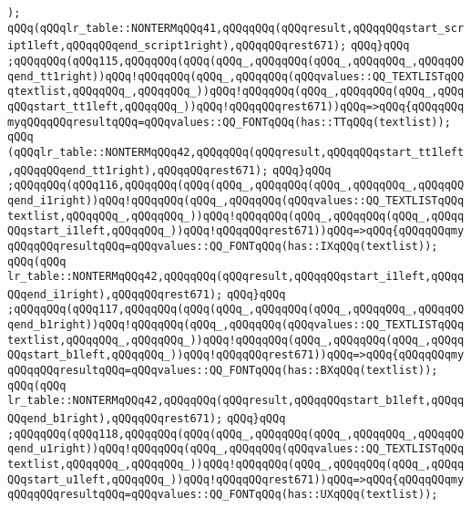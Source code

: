 \verb|);|\newline
\verb|qQQq(qQQqlr_table::NONTERMqQQq41,qQQqqQQq(qQQqresult,qQQqqQQqstart_script1left,qQQqqQQqend_script1right),qQQqqQQqrest671);|\newline
\verb|qQQq}qQQq|\newline
\verb|;qQQqqQQq(qQQq115,qQQqqQQq(qQQq(qQQq_,qQQqqQQq(qQQq_,qQQqqQQq_,qQQqqQQqend_tt1right))qQQq!qQQqqQQq(qQQq_,qQQqqQQq(qQQqvalues::QQ_TEXTLISTqQQqtextlist,qQQqqQQq_,qQQqqQQq_))qQQq!qQQqqQQq(qQQq_,qQQqqQQq(qQQq_,qQQqqQQqstart_tt1left,qQQqqQQq_))qQQq!qQQqqQQqrest671))qQQq=>qQQq{qQQqqQQqmyqQQqqQQqresultqQQq=qQQqvalues::QQ_FONTqQQq(has::TTqQQq(textlist));|\newline
\verb|qQQq|\newline
\verb|(qQQqlr_table::NONTERMqQQq42,qQQqqQQq(qQQqresult,qQQqqQQqstart_tt1left,qQQqqQQqend_tt1right),qQQqqQQqrest671);|\newline
\verb|qQQq}qQQq|\newline
\verb|;qQQqqQQq(qQQq116,qQQqqQQq(qQQq(qQQq_,qQQqqQQq(qQQq_,qQQqqQQq_,qQQqqQQqend_i1right))qQQq!qQQqqQQq(qQQq_,qQQqqQQq(qQQqvalues::QQ_TEXTLISTqQQqtextlist,qQQqqQQq_,qQQqqQQq_))qQQq!qQQqqQQq(qQQq_,qQQqqQQq(qQQq_,qQQqqQQqstart_i1left,qQQqqQQq_))qQQq!qQQqqQQqrest671))qQQq=>qQQq{qQQqqQQqmyqQQqqQQqresultqQQq=qQQqvalues::QQ_FONTqQQq(has::IXqQQq(textlist));|\newline
\verb|qQQq(qQQq|\newline
\verb|lr_table::NONTERMqQQq42,qQQqqQQq(qQQqresult,qQQqqQQqstart_i1left,qQQqqQQqend_i1right),qQQqqQQqrest671);|\newline
\verb|qQQq}qQQq|\newline
\verb|;qQQqqQQq(qQQq117,qQQqqQQq(qQQq(qQQq_,qQQqqQQq(qQQq_,qQQqqQQq_,qQQqqQQqend_b1right))qQQq!qQQqqQQq(qQQq_,qQQqqQQq(qQQqvalues::QQ_TEXTLISTqQQqtextlist,qQQqqQQq_,qQQqqQQq_))qQQq!qQQqqQQq(qQQq_,qQQqqQQq(qQQq_,qQQqqQQqstart_b1left,qQQqqQQq_))qQQq!qQQqqQQqrest671))qQQq=>qQQq{qQQqqQQqmyqQQqqQQqresultqQQq=qQQqvalues::QQ_FONTqQQq(has::BXqQQq(textlist));|\newline
\verb|qQQq(qQQq|\newline
\verb|lr_table::NONTERMqQQq42,qQQqqQQq(qQQqresult,qQQqqQQqstart_b1left,qQQqqQQqend_b1right),qQQqqQQqrest671);|\newline
\verb|qQQq}qQQq|\newline
\verb|;qQQqqQQq(qQQq118,qQQqqQQq(qQQq(qQQq_,qQQqqQQq(qQQq_,qQQqqQQq_,qQQqqQQqend_u1right))qQQq!qQQqqQQq(qQQq_,qQQqqQQq(qQQqvalues::QQ_TEXTLISTqQQqtextlist,qQQqqQQq_,qQQqqQQq_))qQQq!qQQqqQQq(qQQq_,qQQqqQQq(qQQq_,qQQqqQQqstart_u1left,qQQqqQQq_))qQQq!qQQqqQQqrest671))qQQq=>qQQq{qQQqqQQqmyqQQqqQQqresultqQQq=qQQqvalues::QQ_FONTqQQq(has::UXqQQq(textlist));|\newline

